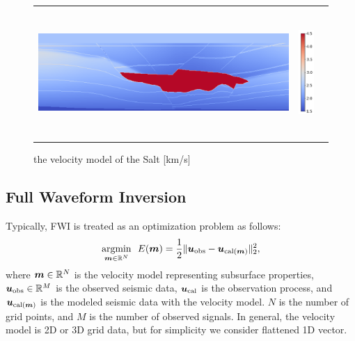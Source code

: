 \begin{figure}[htbp]
    \centering
    \begin{tabular}{m{144mm} m{10mm} m{0mm}}
        \begin{minipage}[b]{146mm}
            \centering
            \includegraphics[width=146mm]{public/full_true_vm}
        \end{minipage} &
        \begin{minipage}[b]{20mm}
            \centering
            \includegraphics[height=49mm]{public/color-bar}
        \end{minipage} &
    \end{tabular}
    \caption{the velocity model of the Salt [km/s]}
    \label{fig:salt-model}
\end{figure}



\subsection{Full Waveform Inversion}\label{subsec:full-waveform-inversion}
Typically, FWI is treated as an optimization problem as follows\cite{FWI0}:
\begin{equation} \label{eq:FWIObjective} \underset{\bm{m} \in \mathbb{R}^N}{\mathrm{argmin}} \ \ E(\bm{m}) = \frac {1} {2} \lVert  \bm{u}_{\mathrm{obs}} - \bm{u}_{\mathrm{cal}(\bm{m})}  \rVert _2^2, \end{equation}
where $\bm{m} \in \mathbb{R}^{N}$ is the velocity model representing subsurface properties, $\bm{u}_{\mathrm{obs}} \in \mathbb{R}^{M}$ is the observed seismic data, $\bm{u}_{\mathrm{cal}}$ is the observation process, and $\bm{u}_{\mathrm{cal}(\bm{m})}$ is the modeled seismic data with the velocity model.
$N$ is the number of grid points, and $M$ is the number of observed signals.
In general, the velocity model is 2D or 3D grid data, but for simplicity we consider flattened 1D vector.

